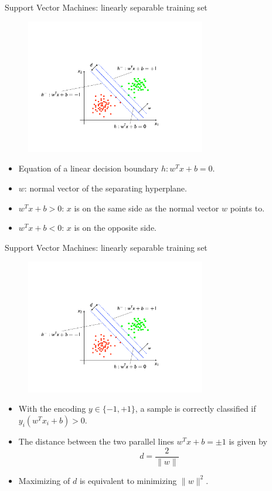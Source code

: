 \documentclass[xcolor=pdftex,dvipsnames,table]{beamer}
\begin{document}
\begin{frame}{Support Vector Machines: linearly separable training set}
	\begin{figure}[htb]
		\includegraphics[width=0.7\textwidth]{../graphics/SVM2.pdf}
	\end{figure}
	\begin{itemize}
		\item Equation of a linear decision boundary $h: w^Tx + b = 0$.
		\item $w$: normal vector of the separating hyperplane.
		\item $w^Tx + b  > 0$: $x$ is on the same side as the normal vector $w$ points to.
		\item $w^Tx + b  < 0$: $x$ is on the opposite side.
	\end{itemize}
\end{frame}

\begin{frame}{Support Vector Machines: linearly separable training set}
	\begin{figure}[htb]
		\includegraphics[width=0.7\textwidth]{../graphics/SVM2.pdf}
	\end{figure}
	\begin{itemize}
		\item With the encoding $y\in\{-1,+1\}$, a sample is correctly classified if $y_i(w^Tx_i + b) > 0$.
		\item The distance between the two parallel lines $w^Tx + b = \pm 1$ is given by
		\begin{equation}
			d = \frac{2}{\|w\|}
		\end{equation}
		\item Maximizing of $d$ is equivalent to minimizing $\|w\|^2$.
	\end{itemize}
\end{frame}
\end{document}
